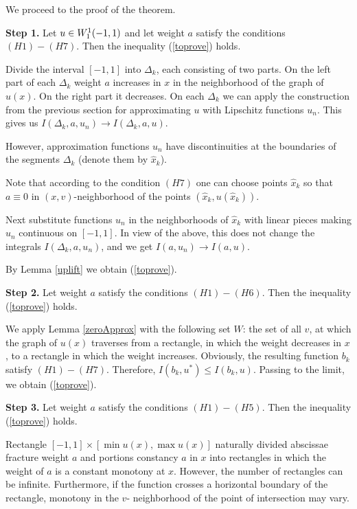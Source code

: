 We proceed to the proof of the theorem.

\bigskip
{\bf Step 1.} Let $u \in W_1^1(-1, 1)$ and let weight $a$ satisfy the conditions $(H1)-(H7)$.
Then the inequality (\ref{toprove}) holds.

Divide the interval $[-1, 1]$ into $\Delta_k$, each consisting of two parts.
On the left part of each $\Delta_k$ weight $a$ increases in $x$ in the neighborhood
of the graph of $u(x)$. On the right part it decreases.
On each $\Delta_k$ we can apply the construction from the previous section
for approximating $u$ with Lipschitz functions $u_n$.
This gives us $I(\Delta_k, a, u_n) \to I(\Delta_k, a, u)$.

However, approximation functions $u_n$ have discontinuities at the boundaries of the segments $\Delta_k$
(denote them by $\hat{x}_k$).

Note that according to the condition $(H7)$ one can choose points $\hat{x}_k$ so
that $a \equiv 0$ in $(x, v)$-neighborhood of the points $(\hat{x}_k, u(\hat{x}_k))$.

Next substitute functions $u_n$ in the neighborhoods of $\hat{x}_k$ with linear pieces
making $u_n$ continuous on $[-1, 1]$.
In view of the above, this does not change the integrals $I(\Delta_k, a, u_n)$,
and we get $I(a, u_n) \to I(a, u)$.

By Lemma \ref{uplift} we obtain (\ref{toprove}).

\bigskip

{\bf Step 2.} Let weight $a$ satisfy the conditions $(H1)-(H6)$.
Then the inequality (\ref{toprove}) holds.

We apply Lemma \ref{zeroApprox} with the following set $W$:
the set of all $v$, at which the graph of $u(x)$ traverses from a rectangle,
in which the weight decreases in $x$,
to a rectangle in which the weight increases.
Obviously, the resulting function $b_k$ satisfy $(H1)-(H7)$.
Therefore, $I(b_k, u^*) \le I(b_k, u)$.
Passing to the limit, we obtain (\ref{toprove}).

\bigskip

{\bf Step 3.} Let weight $a$ satisfy the conditions $(H1)-(H5)$.
Then the inequality (\ref{toprove}) holds.

Rectangle $[-1, 1] \times [\min u(x), \max u(x)]$ naturally
divided abscissae fracture weight $a$ and portions constancy $a$ in $x$ into rectangles
in which the weight of $a$ is a constant monotony at $x$.
However, the number of rectangles can be infinite.
Furthermore, if the function crosses a horizontal boundary of the rectangle,
monotony in the $v$- neighborhood of the point of intersection may vary.

